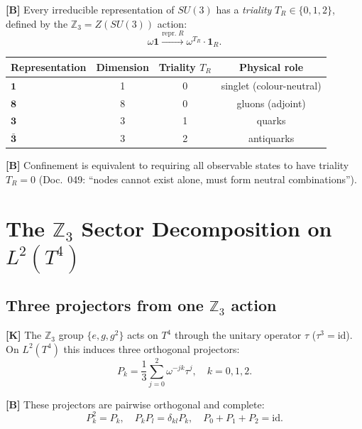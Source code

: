 \textbf{[B]} Every irreducible representation of $SU(3)$ has a
\emph{triality} $T_R \in \{0,1,2\}$, defined by the
$\mathbb{Z}_3 = Z(SU(3))$ action:
\begin{equation}
  \omega\mathbf{1} \xrightarrow{\text{repr.}\;R}
  \omega^{T_R}\cdot\mathbf{1}_R.
\end{equation}

\begin{center}
\begin{tabular}{lccc}
\toprule
Representation & Dimension & Triality $T_R$ & Physical role \\
\midrule
$\mathbf{1}$  & 1  & 0 & singlet (colour-neutral) \\
$\mathbf{8}$  & 8  & 0 & gluons (adjoint) \\
$\mathbf{3}$  & 3  & 1 & quarks \\
$\bar{\mathbf{3}}$ & 3 & 2 & antiquarks \\
\bottomrule
\end{tabular}
\end{center}

\textbf{[B]} Confinement is equivalent to requiring all observable
states to have triality $T_R = 0$ (Doc.~049: ``nodes cannot exist
alone, must form neutral combinations'').

\section{The $\mathbb{Z}_3$ Sector Decomposition on $L^2(T^4)$}

\subsection{Three projectors from one $\mathbb{Z}_3$ action}

\textbf{[K]} The $\mathbb{Z}_3$ group $\{e,g,g^2\}$ acts on $T^4$
through the unitary operator $\tau$ ($\tau^3 = \mathrm{id}$). On
$L^2(T^4)$ this induces three orthogonal projectors:
\begin{equation}
  P_k = \frac{1}{3}\sum_{j=0}^{2}\omega^{-jk}\tau^j,
  \quad k=0,1,2.
  \label{eq:projectors}
\end{equation}

\textbf{[B]} These projectors are pairwise orthogonal and complete:
\begin{equation}
  P_k^2 = P_k,\quad P_kP_l = \delta_{kl}P_k,\quad
  P_0+P_1+P_2 = \mathrm{id}.
\end{equation}


